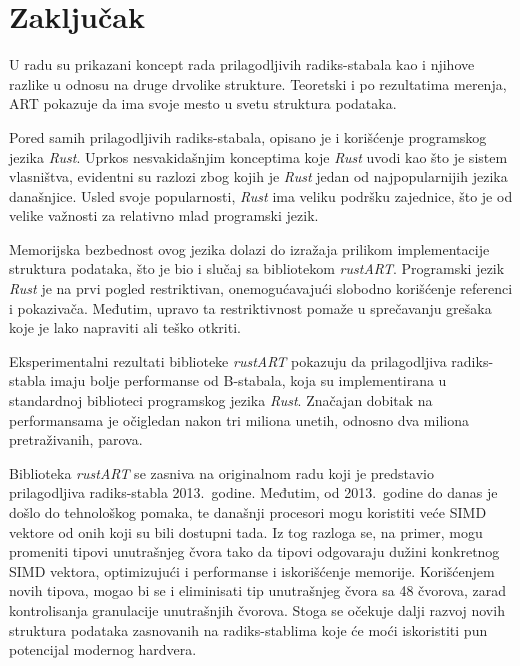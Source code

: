 \documentclass[12pt,oneside]{memoir}
\begin{document}
\chapter{Zaključak}
U radu su prikazani koncept rada prilagodljivih radiks-stabala
kao i njihove razlike u odnosu na druge drvolike strukture.
Teoretski i po rezultatima merenja, ART pokazuje da
ima svoje mesto u svetu struktura podataka.

Pored samih prilagodljivih radiks-stabala, opisano je i korišćenje
programskog jezika \textit{Rust}. Uprkos nesvakidašnjim konceptima
koje \textit{Rust} uvodi kao što je sistem vlasništva,
evidentni su razlozi zbog kojih je \textit{Rust} jedan od najpopularnijih
jezika današnjice. Usled svoje popularnosti, \textit{Rust}
ima veliku podršku zajednice, što je od velike važnosti za
relativno mlad programski jezik.

Memorijska bezbednost ovog jezika dolazi do izražaja
prilikom implementacije struktura podataka, što je bio i slučaj sa
bibliotekom \textit{rustART}. Programski jezik \textit{Rust} je
na prvi pogled restriktivan, onemogućavajući slobodno korišćenje
referenci i pokazivača. Međutim, upravo ta restriktivnost
pomaže u sprečavanju grešaka koje je lako napraviti ali
teško otkriti.

Eksperimentalni rezultati biblioteke \textit{rustART} pokazuju
da prilagodljiva radiks-stabla imaju bolje performanse od
B-stabala, koja su implementirana u standardnoj biblioteci
programskog jezika \textit{Rust}. Značajan dobitak na performansama
je očigledan nakon tri miliona unetih,
odnosno dva miliona pretraživanih, parova.

Biblioteka \textit{rustART} se zasniva na originalnom radu koji je
predstavio prilagodljiva radiks-stabla 2013.\ godine. Međutim,
od 2013.\ godine do danas je došlo do tehnološkog pomaka,
te današnji procesori mogu koristiti veće SIMD vektore od onih koji
su bili dostupni tada. Iz tog razloga se, na primer, mogu
promeniti tipovi unutrašnjeg čvora tako da tipovi odgovaraju
dužini konkretnog SIMD vektora, optimizujući i performanse
i iskorišćenje memorije.
Korišćenjem novih tipova, mogao bi se i eliminisati tip unutrašnjeg
čvora sa 48 čvorova, zarad kontrolisanja granulacije unutrašnjih čvorova.
Stoga se očekuje dalji razvoj
novih struktura podataka zasnovanih na radiks-stablima
koje će moći iskoristiti pun potencijal modernog hardvera.

\literatura
\end{document}
